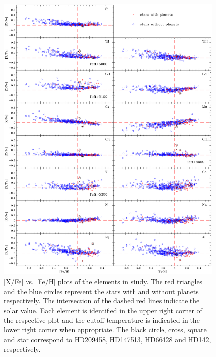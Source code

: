 \documentclass[dvips,12pt,a4paper]{report}
\begin{document}
{{%
\begin{figure}[h!]
\centering
\includegraphics[trim=0cm 2cm 0cm 1cm,clip,width=16 cm]{pics/parte4/xfefehfinal/xfefehtfinal.eps}
\caption[abundance gfx]{[X/Fe] vs. [Fe/H] plots of the elements in study. The red triangles and the blue circles represent the stars with and without planets respectively. The intersection of the dashed red lines indicate the solar value. Each element is identified in the upper right corner of the respective plot and the cutoff temperature is indicated in the lower right corner when appropriate. The black circle, cross, square and star correspond to HD209458, HD147513, HD66428 and HD142, respectively.}
\label{xfefeh1}
\end{figure}

}}
\end{document}
